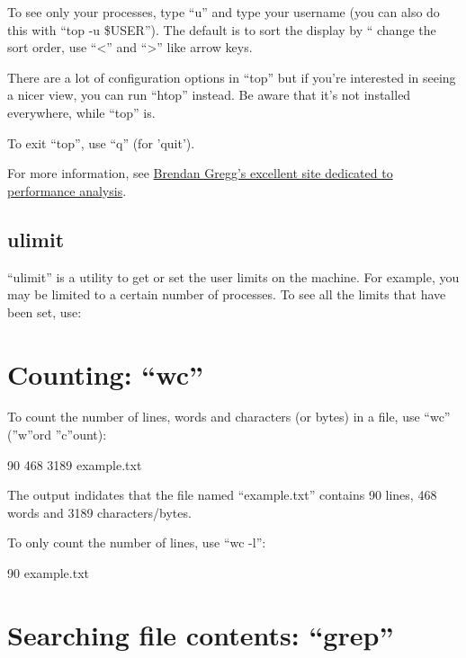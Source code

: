To see only your processes, type ``u'' and type your username (you can also do
this with ``top -u \$USER''). The default is to sort the display by ``%
change the sort order, use ``<'' and ``>'' like arrow keys.

There are a lot of configuration options in ``top'' but if you're interested in
seeing a nicer view, you can run ``htop'' instead. Be aware that it's not
installed everywhere, while ``top'' is.

To exit ``top'', use ``q'' (for 'quit').

For more information, see \href{http://brendangregg.com}{Brendan Gregg's excellent
site dedicated to performance analysis}.

\subsection{ulimit}
``ulimit'' is a utility to get or set the user limits on the machine. For
example, you may be limited to a certain number of processes. To see all the
limits that have been set, use:

\begin{prompt}
\end{prompt}

\section{Counting: ``wc''}

To count the number of lines, words and characters (or bytes) in a file, use ``wc'' (''w''ord ''c''ount):

\begin{prompt}
      90     468    3189  example.txt
\end{prompt}

The output indidates that the file named ``example.txt'' contains 90 lines, 468 words and 3189 characters/bytes.

To only count the number of lines, use ``wc -l'':

\begin{prompt}
      90    example.txt
\end{prompt}

\section{Searching file contents: ``grep''}

